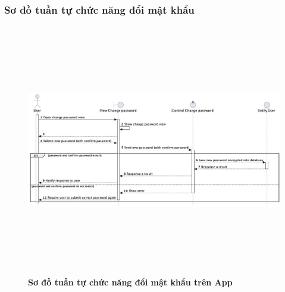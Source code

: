 \documentclass{article}%
\begin{document}
\subsubsection{Sơ đồ tuần tự chức năng đổi mật khẩu}
  \begin{figure}[H]
        \centering
        \includegraphics[width=16cm,height=11cm]{Images/mobile_app/change_password.png}
        \caption[Sơ đồ tuần tự chức năng đổi mật khẩu trên App]{\bfseries \fontsize{12pt}{0pt}
        \selectfont Sơ đồ tuần tự chức năng đổi mật khẩu trên App}
        \label{hinh21} %
  \end{figure}
\end{document}
